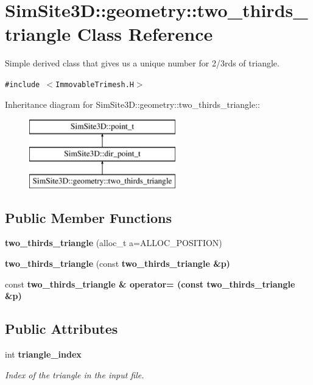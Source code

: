 \section{SimSite3D::geometry::two\_\-thirds\_\-triangle Class Reference}
\label{classSimSite3D_1_1geometry_1_1two__thirds__triangle}
Simple derived class that gives us a unique number for 2/3rds of triangle.  


{\tt \#include $<$Immovable\-Trimesh.H$>$}

Inheritance diagram for SimSite3D::geometry::two\_\-thirds\_\-triangle::\begin{figure}[H]
\begin{center}
\leavevmode
\includegraphics[height=3cm]{classSimSite3D_1_1geometry_1_1two__thirds__triangle}
\end{center}
\end{figure}
\subsection*{Public Member Functions}
\begin{CompactItemize}
\item 
\textbf{two\_\-thirds\_\-triangle} (alloc\_\-t a=ALLOC\_\-POSITION)\label{classSimSite3D_1_1geometry_1_1two__thirds__triangle_c5b749d578f384ebb2f2ebf06b136dad}

\item 
\textbf{two\_\-thirds\_\-triangle} (const \bf{two\_\-thirds\_\-triangle} \&p)\label{classSimSite3D_1_1geometry_1_1two__thirds__triangle_61c17246665ba11761bd28a36450b746}

\item 
const \bf{two\_\-thirds\_\-triangle} \& \textbf{operator=} (const \bf{two\_\-thirds\_\-triangle} \&p)\label{classSimSite3D_1_1geometry_1_1two__thirds__triangle_e4ddddeffcae8e96e30cbe475fc04265}

\end{CompactItemize}
\subsection*{Public Attributes}
\begin{CompactItemize}
\item 
int \bf{triangle\_\-index}\label{classSimSite3D_1_1geometry_1_1two__thirds__triangle_0f34a791ed7ba9f1e116a12da68b1bff}

\begin{CompactList}\small\item\em Index of the triangle in the input file. \item\end{CompactList}\end{CompactItemize}
